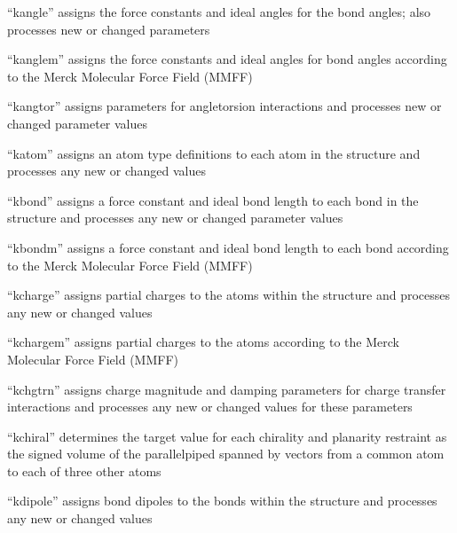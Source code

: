 \documentclass[letterpaper,11pt,english]{sphinxmanual}
\begin{document}
“kangle” assigns the force constants and ideal angles for
the bond angles; also processes new or changed parameters


“kanglem” assigns the force constants and ideal angles for
bond angles according to the Merck Molecular Force Field (MMFF)


“kangtor” assigns parameters for angle\sphinxhyphen{}torsion interactions
and processes new or changed parameter values


“katom” assigns an atom type definitions to each atom in
the structure and processes any new or changed values


“kbond” assigns a force constant and ideal bond length
to each bond in the structure and processes any new or
changed parameter values


“kbondm” assigns a force constant and ideal bond length to
each bond according to the Merck Molecular Force Field (MMFF)


“kcharge” assigns partial charges to the atoms within
the structure and processes any new or changed values


“kchargem” assigns partial charges to the atoms according to
the Merck Molecular Force Field (MMFF)


“kchgtrn” assigns charge magnitude and damping parameters for
charge transfer interactions and processes any new or changed
values for these parameters


“kchiral” determines the target value for each chirality
and planarity restraint as the signed volume of the
parallelpiped spanned by vectors from a common atom to
each of three other atoms


“kdipole” assigns bond dipoles to the bonds within
the structure and processes any new or changed values
\end{document}

